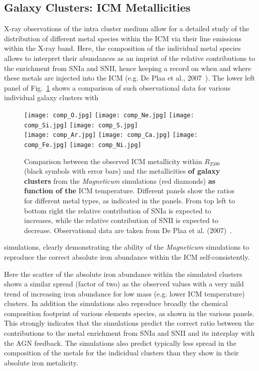 \documentclass[galaxies,letter,accept,moreauthors,pdftex,10pt,a4paper,usenatbib]{mdpi}
\begin{document}
\subsection{Galaxy Clusters: ICM Metallicities}
X-ray observations of the intra cluster medium allow for a detailed
study of the distribution of different metal species within the ICM
via their line emissions within the X-ray band.  Here, the composition
of the individual metal species allows to interpret their abundances
as an imprint of the relative contributions to the enrichment from
SNIa and SNII, hence keeping a record on when and where these metals
are injected into the ICM (e.g. De Plaa et al.,
2007~\cite{2007A&A...465..345D}). The lower left panel of Fig.~\ref{fig3}
shows a comparison of such observational data for various individual galaxy clusters with
\begin{figure}[H]
\begin{center}
  \texttt{[image: comp\_O.jpg]}
  \texttt{[image: comp\_Ne.jpg]}
  \texttt{[image: comp\_Si.jpg]}
  \texttt{[image: comp\_S.jpg]}\\
  \texttt{[image: comp\_Ar.jpg]}
  \texttt{[image: comp\_Ca.jpg]}
  \texttt{[image: comp\_Fe.jpg]}
  \texttt{[image: comp\_Ni.jpg]}
  \caption{Comparison between the observed ICM metallicity within
    $R_{2500}$ (black symbols with error bars) and the metallicities
    {\bf of galaxy clusters} from the {\it Magneticum} simulations (red diamonds)
    {\bf as function of the} ICM temperature. Different panels show the ratios
    for different metal types, as indicated in the panels. From top
    left to bottom right the relative contribution of SNIa is expected
    to increases, while the relative contribution of SNII is expected
    to decrease. Observational data are taken from De Plaa et al.
    (2007)~\cite{2007A&A...465..345D}.  }
   \label{fig3}
\end{center}
\end{figure}
\noindent
simulations, clearly demonstrating the
ability of the {\it Magneticum} simulations to reproduce the
correct absolute iron abundance within the ICM self-consistently.

Here the scatter of the absolute iron abundance within the simulated clusters
shows a similar spread (factor of two) as the observed values with a very mild
trend of increasing iron abundance for low mass (e.g. lower ICM temperature) clusters.
In addition the simulations also reproduce broadly the chemical
composition footprint of various elements species, as shown in the
various panels. This strongly
indicates that the simulations predict the correct ratio between the
contributions to the metal enrichment from SNIa and SNII and its
interplay with the AGN feedback. The simulations also predict
  typically less spread in the composition of the metals for the indicidual
  clusters than they show in their absolute iron metalicity.
\end{document}
